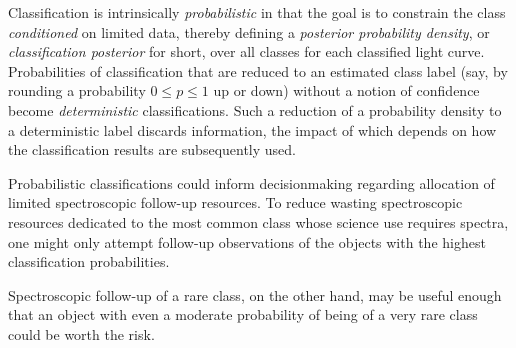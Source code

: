 %
Classification is intrinsically \textit{probabilistic} in that the goal is to constrain the class \textit{conditioned} on limited data, thereby defining a \textit{posterior probability density}, or \textit{classification posterior} for short, over all classes for each classified light curve.
Probabilities of classification that are reduced to an estimated class label (say, by rounding a probability $0 \leq p \leq 1$ up or down) without a notion of confidence become \textit{deterministic} classifications.
Such a reduction of a probability density to a deterministic label discards information, the impact of which depends on how the classification results are subsequently used.


Probabilistic classifications could inform decisionmaking regarding allocation of limited spectroscopic follow-up resources.
To reduce wasting spectroscopic resources dedicated to the most common class whose science use requires spectra, one might only attempt follow-up observations of the objects with the highest classification probabilities.

Spectroscopic follow-up of a rare class, on the other hand, may be useful enough that an object with even a moderate probability of being of a very rare class could be worth the risk.

